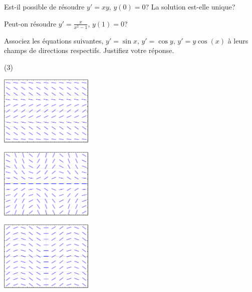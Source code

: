 \begin{exercise}
	Est-il possible de résoudre $y' = xy$, $y(0) = 0$?  La solution est-elle unique?
\end{exercise}

\begin{exercise}
	Peut-on résoudre $y' = \frac{x}{x^2-1}$, $y(1) = 0$?
\end{exercise}

\begin{samepage}
\begin{exercise}
	Associez les équations suivantes, $y'=\sin x$, $y'=\cos y$, $y' = y\cos(x)$ à leurs champs de directions respectifs.
	Justifiez votre réponse.
	\begin{tasks}(3)
		\task	\parbox[c]{1.75in}{\includegraphics[width=1.75in]{figures/yprimecosyslope}}
		\task	\parbox[c]{1.75in}{\includegraphics[width=1.75in]{figures/yprimecosxyslope}}
		\task	\parbox[c]{1.75in}{\includegraphics[width=1.75in]{figures/yprimesinxslope}}
	\end{tasks}
\end{exercise}
\end{samepage}

